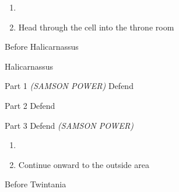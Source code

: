 \begin{paracol}{2}
\vspace{-0.030cm}
\begin{enumerate}[resume]
    \item {}
    \item Head through the cell into the throne room
\end{enumerate}

\switchcolumn*
\begin{steproute}{Before Halicarnassus}
\end{steproute}

\switchcolumn
\begin{boss}{Halicarnassus}
    \varwb
    \begin{notes}
        \item {}
    \end{notes}
    \begin{bossPart}{Part 1}
        \bartz[\bossHl{(3x)}] \rightCommand{\combine} \then \battleGroup{\revivify \space + \antidote} \textit{(SAMSON POWER)} \then {}
        \faris[\bossHl{(1x)}] \leftCommand{\drink} \then \heroDrink
        \cara[\bossHl{(1x)}] Defend
         \leftCommand{\guard}
        \faris[\bossHl{(2x)}] \rightCommand{\gilToss}
    \end{bossPart}
    \begin{bossPart}{Part 2}
        \cara[\bossHl{(1x)}] \rightCommand{\gilToss}
        \bartz Defend
        \faris[\bossHl{(1x)}] \rightCommand{\gilToss}
    \end{bossPart}
    \begin{bossPart}{Part 3}
        \cara Defend
        \bartz[\bossHl{(1x)}] \rightCommand{\combine} \then \battleGroup{\revivify \space + \antidote} \textit{(SAMSON POWER)} \then {}
        \faris[\bossHl{(1x)}] \rightCommand{\gilToss}
    \end{bossPart}
    \varwe
\end{boss}

\begin{enumerate}[resume]
    \item {}
    \item Continue onward to the outside area
\end{enumerate}

\switchcolumn
\begin{steproute}{Before Twintania}
\end{steproute}


\end{paracol}
